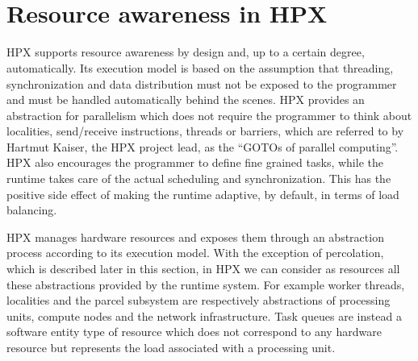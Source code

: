 ~\\~
\section{Resource awareness in HPX} \label{sec:hpxRAC}
HPX supports resource awareness by design and, up to a certain degree, automatically.
Its execution model is based on the assumption that threading, synchronization and data distribution must not be exposed to the programmer and must be handled automatically behind the scenes. HPX provides an abstraction for parallelism which does not require the programmer to think about localities, send/receive instructions, threads or barriers, which are referred to by Hartmut Kaiser, the HPX project lead, as the ``GOTOs of parallel computing''\cite{kaiser2014goto}. HPX also encourages the programmer to define fine grained tasks, while the runtime takes care of the actual scheduling and synchronization. This has the positive side effect of making the runtime adaptive, by default, in terms of load balancing.


HPX manages hardware resources and exposes them through an abstraction process according to its execution model. With the exception of percolation, which is described later in this section, in HPX we can consider as resources all these abstractions provided by the runtime system.
For example worker threads, localities and the parcel subsystem are respectively abstractions of processing units, compute nodes and the network infrastructure. Task queues are instead a software entity type of resource which does not correspond to any hardware resource but represents the load associated with a processing unit.

